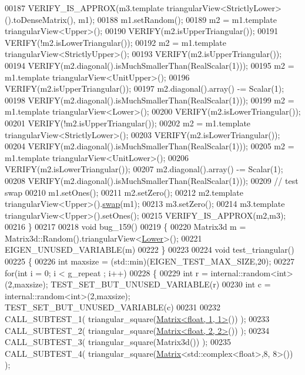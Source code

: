\begin{DoxyCode}
00187   VERIFY\_IS\_APPROX(m3.template triangularView<StrictlyLower>().toDenseMatrix(), m1);
00188   m1.setRandom();
00189   m2 = m1.template triangularView<Upper>();
00190   VERIFY(m2.isUpperTriangular());
00191   VERIFY(!m2.isLowerTriangular());
00192   m2 = m1.template triangularView<StrictlyUpper>();
00193   VERIFY(m2.isUpperTriangular());
00194   VERIFY(m2.diagonal().isMuchSmallerThan(RealScalar(1)));
00195   m2 = m1.template triangularView<UnitUpper>();
00196   VERIFY(m2.isUpperTriangular());
00197   m2.diagonal().array() -= Scalar(1);
00198   VERIFY(m2.diagonal().isMuchSmallerThan(RealScalar(1)));
00199   m2 = m1.template triangularView<Lower>();
00200   VERIFY(m2.isLowerTriangular());
00201   VERIFY(!m2.isUpperTriangular());
00202   m2 = m1.template triangularView<StrictlyLower>();
00203   VERIFY(m2.isLowerTriangular());
00204   VERIFY(m2.diagonal().isMuchSmallerThan(RealScalar(1)));
00205   m2 = m1.template triangularView<UnitLower>();
00206   VERIFY(m2.isLowerTriangular());
00207   m2.diagonal().array() -= Scalar(1);
00208   VERIFY(m2.diagonal().isMuchSmallerThan(RealScalar(1)));
00209   \textcolor{comment}{// test swap}
00210   m1.setOnes();
00211   m2.setZero();
00212   m2.template triangularView<Upper>().\hyperlink{endian_8c_a3ca5ecd34b04d6a243c054ac3a57f68d}{swap}(m1);
00213   m3.setZero();
00214   m3.template triangularView<Upper>().setOnes();
00215   VERIFY\_IS\_APPROX(m2,m3);
00216 \}
00217 
00218 \textcolor{keywordtype}{void} bug\_159()
00219 \{
00220   Matrix3d m = Matrix3d::Random().triangularView<\hyperlink{group__enums_gga39e3366ff5554d731e7dc8bb642f83cda891792b8ed394f7607ab16dd716f60e6}{Lower}>();
00221   EIGEN\_UNUSED\_VARIABLE(m)
00222 \}
00223 
00224 \textcolor{keywordtype}{void} test\_triangular()
00225 \{
00226   \textcolor{keywordtype}{int} maxsize = (std::min)(EIGEN\_TEST\_MAX\_SIZE,20);
00227   \textcolor{keywordflow}{for}(\textcolor{keywordtype}{int} i = 0; i < g\_repeat ; i++)
00228   \{
00229     \textcolor{keywordtype}{int} r = internal::random<int>(2,maxsize); TEST\_SET\_BUT\_UNUSED\_VARIABLE(r)
00230     \textcolor{keywordtype}{int} c = internal::random<int>(2,maxsize); TEST\_SET\_BUT\_UNUSED\_VARIABLE(c)
00231 
00232     CALL\_SUBTEST\_1( triangular\_square(\hyperlink{group___core___module_class_eigen_1_1_matrix}{Matrix<float, 1, 1>}()) );
00233     CALL\_SUBTEST\_2( triangular\_square(\hyperlink{group___core___module_class_eigen_1_1_matrix}{Matrix<float, 2, 2>}()) );
00234     CALL\_SUBTEST\_3( triangular\_square(Matrix3d()) );
00235     CALL\_SUBTEST\_4( triangular\_square(\hyperlink{group___core___module_class_eigen_1_1_matrix}{Matrix}<std::complex<float>,8, 8>()) );

\end{DoxyCode}
